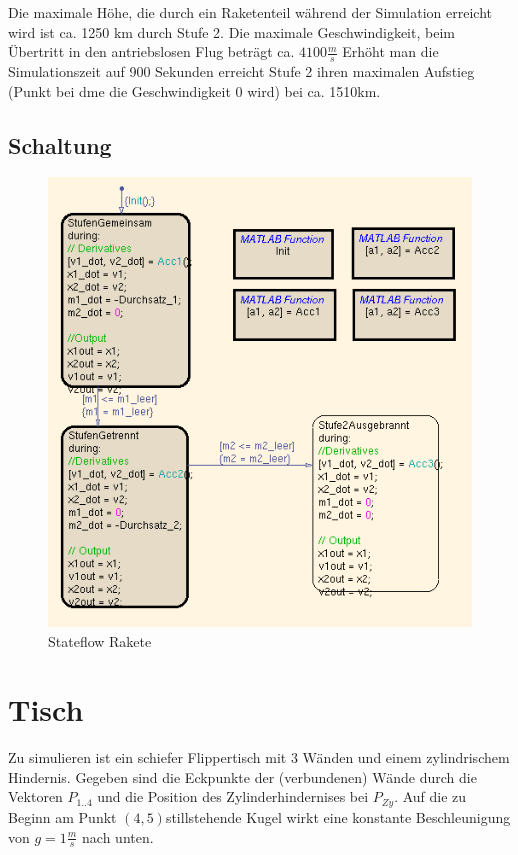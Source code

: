 \documentclass[10pt]{scrartcl}
\begin{document}
	Die maximale Höhe, die durch ein Raketenteil während der Simulation erreicht wird ist ca. 1250 km durch Stufe 2. Die maximale Geschwindigkeit, beim Übertritt in den antriebslosen Flug beträgt ca. $4100 \frac{m}{s}$
	Erhöht man die Simulationszeit auf 900 Sekunden erreicht Stufe 2 ihren maximalen Aufstieg (Punkt bei dme die Geschwindigkeit 0 wird) bei ca. 1510km.
	
	\subsection{Schaltung}
	\begin{figure}[htbp]
		\centering
		\includegraphics[scale=0.55]{ScreenshotRaketeAutomat.png}
		\caption{Stateflow Rakete}
		\label{pic:stateflowRakete}
	\end{figure}

	
\section{Tisch}	
Zu simulieren ist ein schiefer Flippertisch mit 3 Wänden und einem zylindrischem Hindernis. Gegeben sind die Eckpunkte der (verbundenen) Wände durch die Vektoren $P_{1..4}$ und die Position des Zylinderhindernises bei $P_{Zy}$. Auf die zu Beginn am Punkt $(4,5)$stillstehende Kugel wirkt eine konstante Beschleunigung von $g=1\frac{m}{s}$ nach unten. 
		
\end{document}
